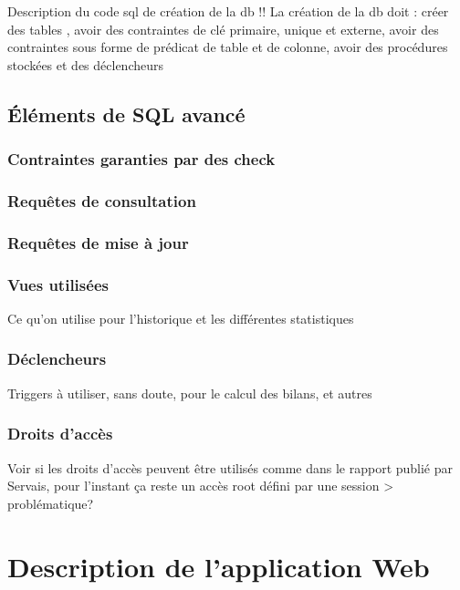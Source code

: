 \documentclass[a4paper,12pt]{article}
\begin{document}
Description du code sql de création de la db 
!! La création de la db doit : créer des tables , avoir des contraintes de clé primaire, unique et externe, avoir des contraintes sous forme de prédicat de table et de colonne, avoir des procédures stockées et des déclencheurs

\subsection{Éléments de SQL avancé}

\subsubsection{Contraintes garanties par des check}

\subsubsection{Requêtes de consultation}

\subsubsection{Requêtes de mise à jour}


\subsubsection{Vues utilisées}

Ce qu'on utilise pour l'historique et les différentes statistiques

\subsubsection{Déclencheurs}

Triggers à utiliser, sans doute, pour le calcul des bilans, et autres 

\subsubsection{Droits d'accès}

Voir si les droits d'accès peuvent être utilisés comme dans le rapport publié par Servais, pour l'instant ça reste un accès root défini par une session > problématique?



\newpage
\section{Description de l'application Web}
\end{document}
